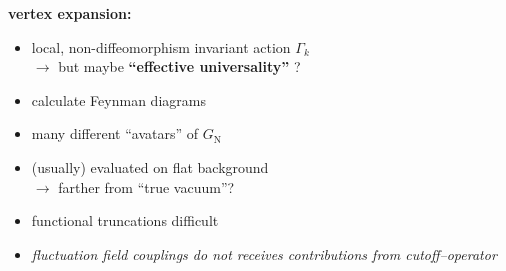 \documentclass[]{beamer}  %
\newcommand\GNewton{ G_{\scriptscriptstyle{\mathrm{N}}}{} }
\begin{document}
\begin{frame}
\begin{columns}[T]
    \begin{column}{.55\textwidth}
      \begin{center}
        \textbf{vertex expansion:}
        \begin{itemize}
          \item
            local, non-diffeomorphism invariant action $\Gamma_k$\\
            $\rightarrow$ but maybe \textbf{``effective universality''} ?\\[8pt]
          \item
            calculate Feynman diagrams\\[8pt]
          \item
            many different ``avatars'' of $\GNewton$\\[8pt]
          \item
            (usually) evaluated on flat background\\
            $\rightarrow$ farther from ``true vacuum''?\\[8pt]
          \item
            functional truncations difficult\\[8pt]
          \item
            \textit{
              fluctuation field couplings do not receives contributions
              from cutoff--operator
            }\\[8pt]
        \end{itemize}
      \end{center}
    \end{column}

  \end{columns}
\end{frame}


\end{document}
